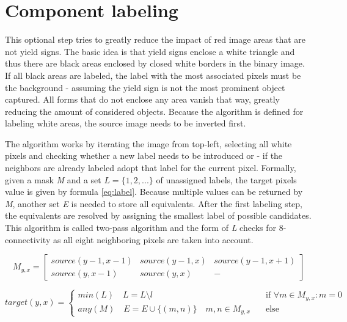 \documentclass{report}
\begin{document}
\section{Component labeling}
\label{sec:pipeline_complab}

This optional step tries to greatly reduce the impact of red image
areas that are not yield signs. The basic idea is that yield signs
enclose a white triangle and thus there are black areas enclosed by
closed white borders in the binary image. If all black areas are
labeled, the label with the most associated pixels must be the
background - assuming the yield sign is not the most prominent object
captured. All forms that do not enclose any area vanish that way,
greatly reducing the amount of considered objects. Because the
algorithm is defined for labeling white areas, the source image needs
to be inverted first.

The algorithm works by iterating the image from top-left, selecting
all white pixels and checking whether a new label needs to be
introduced or - if the neighbors are already labeled adopt that label
for the current pixel. Formally, given a mask \textit{M} and a set \(
L = \{1, 2, ... \} \) of unassigned labels, the target pixels value is
given by formula \ref{eq:label}. Because multiple values can be
returned by \textit{M}, another set \textit{E} is needed to store all
equivalents. After the first labeling step, the equivalents are
resolved by assigning the smallest label of possible candidates. This
algorithm is called two-pass algorithm and the form of \textit{L}
checks for 8-connectivity as all eight neighboring pixels are taken
into account.

\begin{equation}
  M_{y, x} = \begin{bmatrix}
    source(y-1, x-1) & source(y-1, x) & source(y-1, x+1) \\
    source(y, x-1)   & source(y, x)   & -
  \end{bmatrix}
\end{equation}


\begin{equation}\label{eq:label}
    target(y, x) =
    \begin{cases}
      min(L) \quad L = L \setminus l & \quad \text{if } \forall m \in M_{y, x}: m = 0 \\
      any(M) \quad E = E \cup \{(m, n)\} \quad m, n \in M_{y, x} & \quad \text{else}
    \end{cases}
\end{equation}
\end{document}
